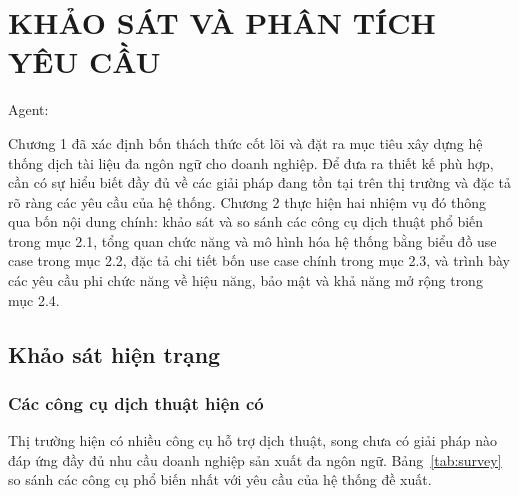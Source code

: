 \chapter{KHẢO SÁT VÀ PHÂN TÍCH YÊU CẦU}

Agent:

Chương 1 đã xác định bốn thách thức cốt lõi và đặt ra mục tiêu xây dựng hệ thống dịch tài liệu đa ngôn ngữ cho doanh nghiệp. Để đưa ra thiết kế phù hợp, cần có sự hiểu biết đầy đủ về các giải pháp đang tồn tại trên thị trường và đặc tả rõ ràng các yêu cầu của hệ thống. Chương 2 thực hiện hai nhiệm vụ đó thông qua bốn nội dung chính: khảo sát và so sánh các công cụ dịch thuật phổ biến trong mục 2.1, tổng quan chức năng và mô hình hóa hệ thống bằng biểu đồ use case trong mục 2.2, đặc tả chi tiết bốn use case chính trong mục 2.3, và trình bày các yêu cầu phi chức năng về hiệu năng, bảo mật và khả năng mở rộng trong mục 2.4.

\section{Khảo sát hiện trạng}

\subsection{Các công cụ dịch thuật hiện có}

Thị trường hiện có nhiều công cụ hỗ trợ dịch thuật, song chưa có giải pháp nào đáp ứng đầy
đủ nhu cầu doanh nghiệp sản xuất đa ngôn ngữ. Bảng~\ref{tab:survey} so sánh các công cụ phổ
biến nhất với yêu cầu của hệ thống đề xuất.

